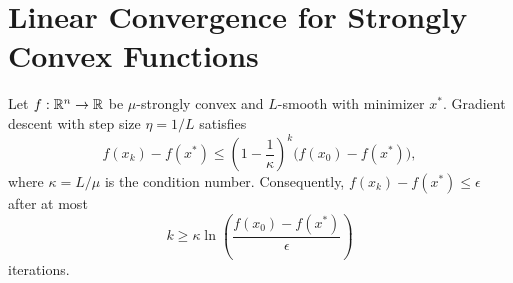 \documentclass[11pt,a4paper]{article}
\begin{document}

\section{Linear Convergence for Strongly Convex Functions}\label{sec:linear-rate}

\begin{theorem}\label{thm:linear-rate}
Let $f : \mathbb{R}^n \to \mathbb{R}$ be $\mu$-strongly convex and $L$-smooth with minimizer
$x^*$. Gradient descent with step size $\eta = 1/L$ satisfies
\begin{equation}\label{eq:linear-rate}
  f(x_k) - f(x^*) \le \left(1 - \frac{1}{\kappa}\right)^k
  \bigl(f(x_0) - f(x^*)\bigr),
\end{equation}
where $\kappa = L/\mu$ is the condition number. Consequently,
$f(x_k) - f(x^*) \le \epsilon$ after at most
\begin{equation}\label{eq:iter-count}
  k \ge \kappa \ln\!\left(\frac{f(x_0) - f(x^*)}{\epsilon}\right)
\end{equation}
iterations.
\end{theorem}
\end{document}
